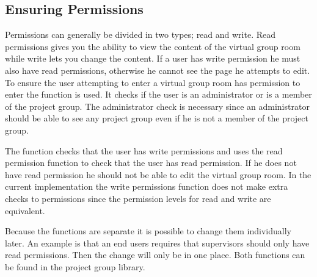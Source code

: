 \subsection{Ensuring Permissions}
\label{sec:projectgrouproommanagerights}
Permissions can generally be divided in two types; read and write. 
Read permissions gives you the ability to view the content of the virtual group room while write lets you change the content. 
If a user has write permission he must also have read permissions, otherwise he cannot see the page he attempts to edit. 
To ensure the user attempting to enter a virtual group room has permission to enter the function  is used. 
It checks if the user is an administrator or is a member of the project group. 
The administrator check is necessary since an administrator should be able to see any project group even if he is not a member of the project group. 

The function  checks that the user has write permissions and uses the read permission function to check that the user has read permission.
If he does not have read permission he should not be able to edit the virtual group room. 
In the current implementation the write permissions function does not make extra checks to permissions since the permission levels for read and write are equivalent.

Because the functions are separate it is possible to change them individually later.
An example is that an end users requires that supervisors should only have read permissions. Then the change will only be in one place. 
Both functions can be found in the project group library.
